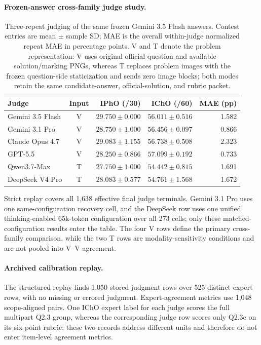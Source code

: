 \documentclass[11pt]{article}
\begin{document}
\paragraph{Frozen-answer cross-family judge study.}
\begin{table}[t]
\centering
\scriptsize
\setlength{\tabcolsep}{2.2pt}
\renewcommand{\arraystretch}{1.02}
\begin{tabular}{l c r r r}
\toprule
\textbf{Judge} & \textbf{Input} & \textbf{IPhO (/30)} & \textbf{IChO (/60)} & \textbf{MAE (pp)} \\
\midrule
Gemini 3.5 Flash & V & $29.750\pm0.000$ & $56.011\pm0.516$ & 1.582 \\
Gemini 3.1 Pro & V & $28.750\pm1.000$ & $56.456\pm0.097$ & 0.866 \\
Claude Opus 4.7 & V & $29.083\pm1.155$ & $56.738\pm0.508$ & 2.323 \\
GPT-5.5 & V & $28.250\pm0.866$ & $57.099\pm0.192$ & 0.733 \\
Qwen3.7-Max & T & $27.750\pm1.000$ & $54.442\pm0.815$ & 1.691 \\
DeepSeek V4 Pro & T & $28.083\pm0.577$ & $54.761\pm1.568$ & 1.672 \\
\bottomrule
\end{tabular}
\caption{Three-repeat judging of the same frozen Gemini 3.5 Flash answers. Contest entries are mean $\pm$ sample SD; MAE is the overall within-judge normalized repeat MAE in percentage points. V and T denote the problem representation: V uses original official question and available solution/marking PNGs, whereas T replaces problem images with the frozen question-side staticization and sends zero image blocks; both modes retain the same candidate-answer, official-solution, and rubric packet.}
\label{tab:cross-family-judge-stability}
\end{table}

Strict replay covers all 1,638 effective final judge terminals. Gemini 3.1 Pro uses one same-configuration recovery cell, and the DeepSeek row uses one unified thinking-enabled 65k-token configuration over all 273 cells; only these matched-configuration results enter the table. The four V rows define the primary cross-family comparison, while the two T rows are modality-sensitivity conditions and are not pooled into V--V agreement.

\paragraph{Archived calibration replay.}
The structured replay finds 1,050 stored judgment rows over 525 distinct expert rows, with no missing or errored judgment. Expert-agreement metrics use 1,048 scope-aligned pairs. One IChO expert label for each judge scores the full multipart Q2.3 group, whereas the corresponding judge row scores only Q2.3c on its six-point rubric; these two records address different units and therefore do not enter item-level agreement metrics.
\end{document}
